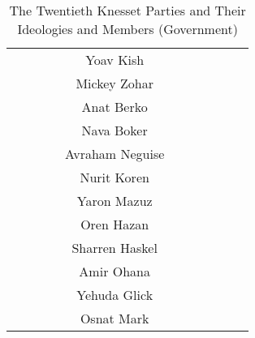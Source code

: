 \begin{landscape}
\begin{table}
\begin{tabular}{|c|c|c|c|c|c|c|c|c|c|c|}
                            &                   &                   &                      & Yoav Kish          &                   &                    \\
                            &                   &                   &                      & Mickey Zohar       &                   &                    \\
                            &                   &                   &                      & Anat Berko         &                   &                    \\
                            &                   &                   &                      & Nava Boker         &                   &                    \\
                            &                   &                   &                      & Avraham Neguise    &                   &                    \\
                            &                   &                   &                      & Nurit Koren        &                   &                    \\
                            &                   &                   &                      & Yaron Mazuz        &                   &                    \\
                            &                   &                   &                      & Oren Hazan         &                   &                    \\
                            &                   &                   &                      & Sharren Haskel     &                   &                    \\
                            &                   &                   &                      & Amir Ohana         &                   &                    \\
                            &                   &                   &                      & Yehuda Glick       &                   &                    \\
                            &                   &                   &                      & Osnat Mark         &                   &                    \\
  \hline
\end{tabular}
\caption{The Twentieth Knesset Parties and Their Ideologies and Members (Government)}
\label{table:knesset_party_members_government}
\end{table}


\end{landscape}
